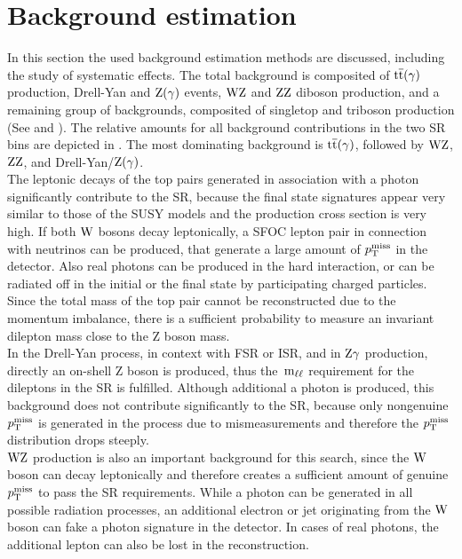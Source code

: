 \section{Background estimation}\label{sec:BKG}
In this section the used background estimation methods are discussed, including the study of systematic effects. The total background is composited of ${\mathrm{t}\overline{\mathrm{t}}}(\gamma)$ production, Drell-Yan and $\mathrm{Z}(\gamma)$ events, $\mathrm{W}\mathrm{Z}$ and $\mathrm{Z}\mathrm{Z}$ diboson production, and a remaining group of backgrounds, composited of \eg singletop and triboson production (See  and ). The relative amounts for all background contributions in the two SR bins are depicted in . The most dominating background is ${\mathrm{t}\overline{\mathrm{t}}}(\gamma)$, followed by $\mathrm{W}\mathrm{Z}$, $\mathrm{Z}\mathrm{Z}$, and Drell-Yan/$\mathrm{Z}(\gamma)$.\\
The leptonic decays of the top pairs generated in association with a photon significantly contribute to the SR, because the final state signatures appear very similar to those of the SUSY models and the production cross section is very high. If both $\mathrm{W}$ bosons decay leptonically, a SFOC lepton pair in connection with neutrinos can be produced, that generate a large amount of $p_{\mathrm{T}}^\text{miss}$ in the detector. Also real photons can be produced in the hard interaction, or can be radiated off in the initial or the final state by participating charged particles. Since the total mass of the top pair cannot be reconstructed due to the momentum imbalance, there is a sufficient probability to measure an invariant dilepton mass close to the Z boson mass.\\
In the Drell-Yan process, in context with FSR or ISR, and in $\mathrm{Z}\gamma$ production, directly an on-shell Z boson is produced, thus the $\,\text{m}_{\ell\ell}$ requirement for the dileptons in the SR is fulfilled. Although additional a photon is produced, this background does not contribute significantly to the SR, because only nongenuine $p_{\mathrm{T}}^\text{miss}$ is generated in the process due to mismeasurements and therefore the $p_{\mathrm{T}}^\text{miss}$ distribution drops steeply.\\
$\mathrm{W}\mathrm{Z}$ production is also an important background for this search, since the $\mathrm{W}$ boson can decay leptonically and therefore creates a sufficient amount of genuine $p_{\mathrm{T}}^\text{miss}$ to pass the SR requirements. While a photon can be generated in all possible radiation processes, an additional electron or jet originating from the $\mathrm{W}$ boson can fake a photon signature in the detector. In cases of real photons, the additional lepton can also be lost in the reconstruction.\\
